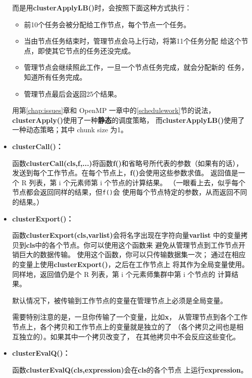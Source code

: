 \begin{itemize}
而是用{\bf clusterApplyLB()}时，会按照下面这种方式执行：

\begin{itemize}

\item 前10个任务会被分配给工作节点，每个节点一个任务。

\item 当由节点任务结束时，管理节点会马上行动，将第11个任务分配
给这个节点，即使其它节点的任务还没完成。

\item 管理节点会继续照此工作，一旦一个节点任务完成，就会分配新的
任务，知道所有任务完成。

\item 管理节点最后会返回25个结果。

\end{itemize}

用第\ref{chap:issues}章和 OpenMP 一章中的\ref{schedulework}节的说法，
{\bf clusterApply()}使用了一种{\bf 静态}的调度策略，
而{\bf clusterApplyLB()}使用了一种动态策略；其中 chunk size 为1。

\item {\bf clusterCall()：}

函数{\bf clusterCall(cls,f,...)}将函数{\bf f()}和省略号所代表的参数（如果有的话），
发送到每个工作节点。在每个节点上，{\bf f()}会使用这些参数求值。
返回值是一个 R 列表，第 i 个元素师第 i 个节点的计算结果。
（一眼看上去，似乎每个节点都会返回同样的结果，但{\tt f()}会
使用每个节点特定的参数，从而返回不同的结果。）

\item {\bf clusterExport()：}

函数{\bf clusterExport(cls,varlist)}会将名字出现在字符向量{\bf varlist}
中的变量拷贝到{\bf cls}中的各个节点。你可以使用这个函数来
避免从管理节点到工作节点开销巨大的数据传输。
使用这个函数，你可以只传输数据集一次；
通过在相应的变量上使用{\bf clusterExport()}，之后在工作节点上
将其作为全局变量使用。
同样地，返回值仍是个 R 列表，第 i 个元素师集群中第 i 个节点的
计算结果。

默认情况下，被传输到工作节点的变量在管理节点上必须是全局变量。

需要特别注意的是，一旦你传输了一个变量，比如{\bf x}，
从管理节点到各个工作节点上，各个拷贝和工作节点上的变量就是独立的了
（各个拷贝之间也是相互独立的）。如果其中一个拷贝改变了，
在其他拷贝中不会反应这些变化。

\item {\bf clusterEvalQ()：}

函数{\bf clusterEvalQ(cls,expression)}会在{\bf cls}的各个节点
上运行{\bf expression}。

\end{itemize}

